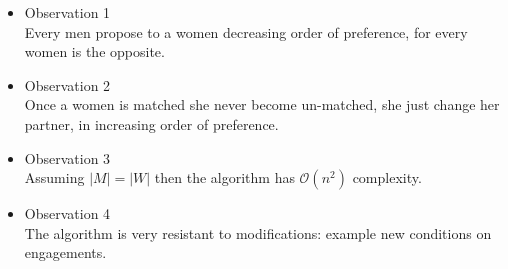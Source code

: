 \begin{itemize}
	\item Observation 1\\
	      Every men propose to a women decreasing order of preference, for every women is the opposite.

	\item Observation 2\\
	      Once a women is matched she never become un-matched, she just change her partner, in increasing order of preference.

	\item Observation 3\\
	      Assuming $|M| = |W|$ then the algorithm has $\mathcal{O}(n^{2})$ complexity.

	\item Observation 4\\
	      The algorithm is very resistant to modifications: example new conditions on engagements.
\end{itemize}

\clearpage

